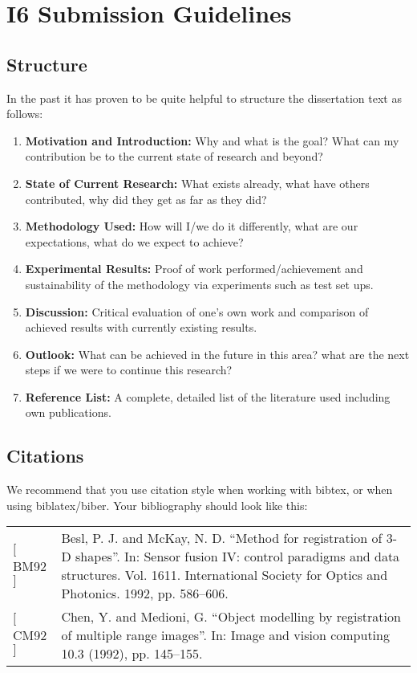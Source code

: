 \chapter{I6 Submission Guidelines}%

\section{Structure}

In the past it has proven to be quite helpful to structure the dissertation text as follows:
\begin{enumerate}[I]
    \item \textbf{Motivation and Introduction:} Why and what is the goal? What can my contribution be to the current state of research and beyond?
    \item \textbf{State of Current Research:} What exists already, what have others contributed, why did they get as far as they did?
    \item \textbf{Methodology Used:} How will I/we do it differently, what are our expectations, what do we expect to achieve?
    \item \textbf{Experimental Results:} Proof of work performed/achievement and sustainability of the methodology via experiments such as test set ups.
    \item \textbf{Discussion:} Critical evaluation of one’s own work and comparison of achieved results with currently existing results.
    \item \textbf{Outlook:} What can be achieved in the future in this area? what are the next steps if we were to continue this research?
    \item \textbf{Reference List:} A complete, detailed list of the literature used including own publications.
\end{enumerate}

\section{Citations}

We recommend that you use \href{https://ctan.org/texarchive/bibliography/bibtex/contrib/german/din1505}{} citation style when working with bibtex, or  when using biblatex/biber.
Your bibliography should look like this:

\begin{table}[ht]
    \begin{tabular}{lp{13.5cm}}
        $[$BM92$]$ & Besl, P. J. and McKay, N. D. “Method for registration of 3-D shapes”. In: Sensor
        fusion IV: control paradigms and data structures. Vol. 1611. International Society
        for Optics and Photonics. 1992, pp. 586–606.\\
        $[$CM92$]$ & Chen, Y. and Medioni, G. “Object modelling by registration of multiple range
        images”. In: Image and vision computing 10.3 (1992), pp. 145–155.\\
    \end{tabular}
\end{table}

